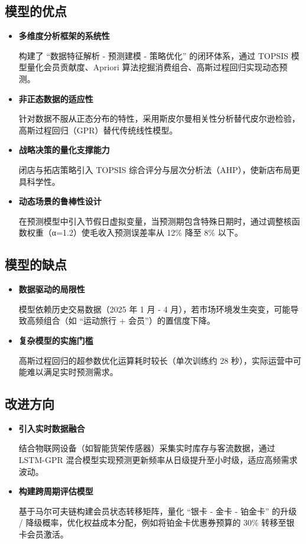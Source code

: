 \documentclass[withoutpreface,bwprint]{cumcmthesis}
\begin{document}
\subsection{模型的优点}
\begin{itemize}[itemindent=2em]
\item \textbf{多维度分析框架的系统性}\par
构建了 “数据特征解析 - 预测建模 - 策略优化” 的闭环体系，通过 TOPSIS 模型量化会员贡献度、Apriori 算法挖掘消费组合、高斯过程回归实现动态预测。
\par
\item \textbf{非正态数据的适应性}\par
针对数据不服从正态分布的特性，采用斯皮尔曼相关性分析替代皮尔逊检验，高斯过程回归（GPR）替代传统线性模型。
\par
\item \textbf{战略决策的量化支撑能力}\par
闭店与拓店策略引入 TOPSIS 综合评分与层次分析法（AHP），使新店布局更具科学性。
\par
\item \textbf{动态场景的鲁棒性设计}\par
在预测模型中引入节假日虚拟变量，当预测期包含特殊日期时，通过调整核函数权重（α=1.2）使毛收入预测误差率从 12\% 降至 8\% 以下。
\par
\end{itemize}

\subsection{模型的缺点}
\begin{itemize}[itemindent=2em]
\item \textbf{数据驱动的局限性}\par
模型依赖历史交易数据（2025 年 1 月 - 4 月），若市场环境发生突变，可能导致高频组合（如 “运动旅行 + 会员”）的置信度下降。
\par

\item \textbf{复杂模型的实施门槛}\par
高斯过程回归的超参数优化运算耗时较长（单次训练约 28 秒），实际运营中可能难以满足实时预测需求。
\par
\end{itemize}

\subsection{改进方向}
\begin{itemize}[itemindent=2em]
\item \textbf{引入实时数据融合}\par
结合物联网设备（如智能货架传感器）采集实时库存与客流数据，通过 LSTM-GPR 混合模型实现预测更新频率从日级提升至小时级，适应高频需求波动。
\par

\item \textbf{构建跨周期评估模型}\par
基于马尔可夫链构建会员状态转移矩阵，量化 “银卡 - 金卡 - 铂金卡” 的升级 / 降级概率，优化权益成本分配，例如将铂金卡优惠券预算的 30\% 转移至银卡会员激活。
\par
\end{itemize}
\end{document}
